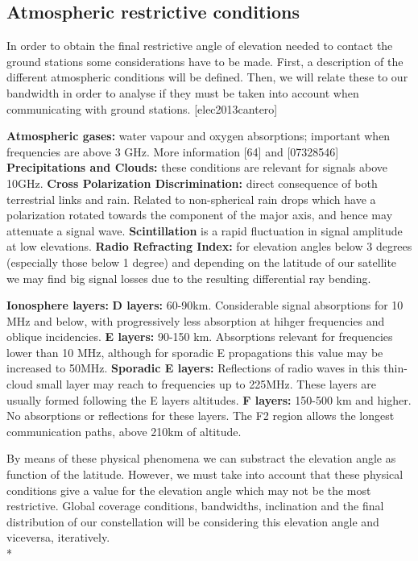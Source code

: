 \subsection{Atmospheric restrictive conditions}
In order to obtain the final restrictive angle of elevation needed to contact the ground stations some considerations have to be made. First, a description of the different atmospheric conditions will be defined. Then, we will relate these to our bandwidth in order to analyse if they must be taken into account when communicating with ground stations. [elec2013cantero]

\textendash\textbf{ Atmospheric gases: }water vapour and oxygen absorptions; important when frequencies are above 3 GHz. More information [64] and [07328546]
\textendash\textbf{ Precipitations and Clouds: }these conditions are relevant for signals above 10GHz.
\textendash\textbf{ Cross Polarization Discrimination: }direct consequence of both terrestrial links and rain. Related to non-spherical rain drops which have a polarization rotated towards the component of the major axis, and hence may attenuate a signal wave.
\textendash\textbf{ Scintillation } is a rapid fluctuation in signal amplitude at low elevations.
\textendash\textbf{ Radio Refracting Index: } for elevation angles below 3 degrees (especially those below 1 degree) and depending on the latitude of our satellite we may find big signal losses due to the resulting differential ray bending.

\textendash\textbf{ Ionosphere layers: }
\textbf{D layers:} 60-90km. Considerable signal absorptions for 10 MHz and below, with progressively less absorption at hihger frequencies and oblique incidencies.
\textbf{E layers:} 90-150 km. Absorptions relevant for frequencies lower than 10 MHz, although for sporadic E propagations this value may be increased to 50MHz.
\textbf{Sporadic E layers:} Reflections of radio waves in this thin-cloud small layer may reach to frequencies up to 225MHz. These layers are usually formed following the E layers altitudes.
\textbf{F layers:} 150-500 km and higher. No absorptions or reflections for these layers. The F2 region allows the longest communication paths, above 210km of altitude.


By means of these physical phenomena we can substract the elevation angle as function of the latitude. However, we must take into account that these physical conditions give a value for the elevation angle which may not be the most restrictive. Global coverage conditions, bandwidths, inclination and the final distribution of our constellation will be considering this elevation angle and viceversa, iteratively. \\*

